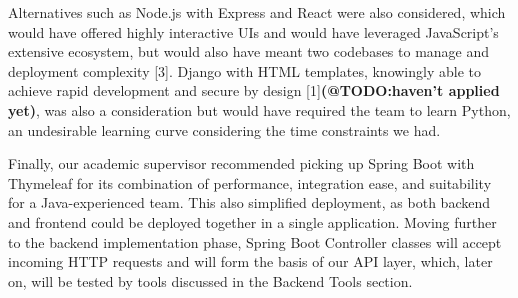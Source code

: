 Alternatives such as Node.js with Express and React were also considered, which would have offered highly interactive UIs and would have leveraged JavaScript's extensive ecosystem, but would also have meant two codebases to manage and deployment complexity [3]. Django with HTML templates, knowingly able to achieve rapid development and secure by design [1]\textbf{(@TODO:haven't applied yet)}, was also a consideration but would have required the team to learn Python, an undesirable learning curve considering the time constraints we had.

Finally, our academic supervisor recommended picking up Spring Boot with Thymeleaf for its combination of performance, integration ease, and suitability for a Java-experienced team. This also simplified deployment, as both backend and frontend could be deployed together in a single application. Moving further to the backend implementation phase, Spring Boot Controller classes will accept incoming HTTP requests and will form the basis of our API layer, which, later on, will be tested by tools discussed in the Backend Tools section.
